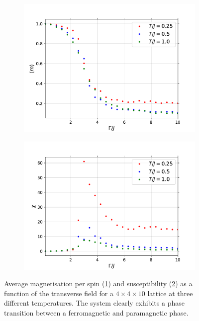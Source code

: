 \documentclass[11pt,openany]{article}
\begin{document}
\begin{figure}[H]
	\centering
	\begin{subfigure}{0.45\textwidth}
		\centering
		\caption{}
		\label{fig:gamma_m_T}
		\includegraphics[width=\textwidth]{Plots/gamma_transition_m_T.pdf}
	\end{subfigure}
	\begin{subfigure}{0.45\textwidth}
		\centering
		\caption{}
		\label{fig:gamma_chi_T}
		\includegraphics[width=\textwidth]{Plots/gamma_transition_chi_T.pdf}
	\end{subfigure}
	\caption{Average magnetisation per spin (\ref{fig:gamma_m_T}) and susceptibility (\ref{fig:gamma_chi_T}) as a function of the transverse field for a $4\times4\times10$ lattice at three different temperatures. The system clearly exhibits a phase transition between a ferromagnetic and paramagnetic phase.}
	\label{fig:gamma_transition_T}
\end{figure}
\end{document}
